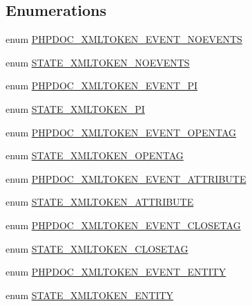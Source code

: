 \subsection*{\-Enumerations}
\begin{DoxyCompactItemize}
\item 
enum \hyperlink{_tokenizer_8php_a27c5d3a8fc7d9fd7f2685d281094093f}{\-P\-H\-P\-D\-O\-C\-\_\-\-X\-M\-L\-T\-O\-K\-E\-N\-\_\-\-E\-V\-E\-N\-T\-\_\-\-N\-O\-E\-V\-E\-N\-T\-S} 
\item 
enum \hyperlink{_tokenizer_8php_a7fb103fc628bc59b3053ca8fcac37921}{\-S\-T\-A\-T\-E\-\_\-\-X\-M\-L\-T\-O\-K\-E\-N\-\_\-\-N\-O\-E\-V\-E\-N\-T\-S} 
\item 
enum \hyperlink{_tokenizer_8php_a9d64f450acb39c59e48067d652ff1340}{\-P\-H\-P\-D\-O\-C\-\_\-\-X\-M\-L\-T\-O\-K\-E\-N\-\_\-\-E\-V\-E\-N\-T\-\_\-\-P\-I} 
\item 
enum \hyperlink{_tokenizer_8php_a1f078e0549b406ef45cdb00ad61268fb}{\-S\-T\-A\-T\-E\-\_\-\-X\-M\-L\-T\-O\-K\-E\-N\-\_\-\-P\-I} 
\item 
enum \hyperlink{_tokenizer_8php_a7620db64de663b32e006762168273110}{\-P\-H\-P\-D\-O\-C\-\_\-\-X\-M\-L\-T\-O\-K\-E\-N\-\_\-\-E\-V\-E\-N\-T\-\_\-\-O\-P\-E\-N\-T\-A\-G} 
\item 
enum \hyperlink{_tokenizer_8php_a5b9d87f7493d022b7688b62818647c91}{\-S\-T\-A\-T\-E\-\_\-\-X\-M\-L\-T\-O\-K\-E\-N\-\_\-\-O\-P\-E\-N\-T\-A\-G} 
\item 
enum \hyperlink{_tokenizer_8php_ae72e1c850c61a3f902ff6230cc2f220e}{\-P\-H\-P\-D\-O\-C\-\_\-\-X\-M\-L\-T\-O\-K\-E\-N\-\_\-\-E\-V\-E\-N\-T\-\_\-\-A\-T\-T\-R\-I\-B\-U\-T\-E} 
\item 
enum \hyperlink{_tokenizer_8php_ab0b75d051dd38b2bc3e4e223c2ea605f}{\-S\-T\-A\-T\-E\-\_\-\-X\-M\-L\-T\-O\-K\-E\-N\-\_\-\-A\-T\-T\-R\-I\-B\-U\-T\-E} 
\item 
enum \hyperlink{_tokenizer_8php_a5e960f31218121e5ddc53dd4c4f89a06}{\-P\-H\-P\-D\-O\-C\-\_\-\-X\-M\-L\-T\-O\-K\-E\-N\-\_\-\-E\-V\-E\-N\-T\-\_\-\-C\-L\-O\-S\-E\-T\-A\-G} 
\item 
enum \hyperlink{_tokenizer_8php_a31b63ac40720cf6bef047eecb65eb91e}{\-S\-T\-A\-T\-E\-\_\-\-X\-M\-L\-T\-O\-K\-E\-N\-\_\-\-C\-L\-O\-S\-E\-T\-A\-G} 
\item 
enum \hyperlink{_tokenizer_8php_aea2f601193eac2266ffb4d4e5768a792}{\-P\-H\-P\-D\-O\-C\-\_\-\-X\-M\-L\-T\-O\-K\-E\-N\-\_\-\-E\-V\-E\-N\-T\-\_\-\-E\-N\-T\-I\-T\-Y} 
\item 
enum \hyperlink{_tokenizer_8php_a51dbaa54e030af4c329d484f17b4af75}{\-S\-T\-A\-T\-E\-\_\-\-X\-M\-L\-T\-O\-K\-E\-N\-\_\-\-E\-N\-T\-I\-T\-Y} 

\end{DoxyCompactItemize}
